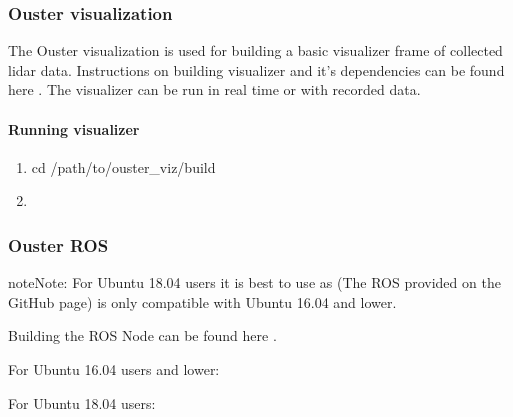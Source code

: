 \documentclass[letterpaper,10pt,english]{sphinxmanual}
\begin{document}
\subsubsection{Ouster visualization}
\label{\detokenize{Ouster lidar:ouster-visualization}}
The Ouster visualization is used for building a basic visualizer frame of collected lidar data. Instructions on building visualizer and it’s dependencies can be found here .
The visualizer can be run in real time or with recorded data.


\paragraph{Running visualizer}
\label{\detokenize{Ouster lidar:running-visualizer}}\begin{enumerate}
\def\theenumi{\arabic{enumi}}
\def\labelenumi{\theenumi .}
\makeatletter\def\p@enumii{\p@enumi \theenumi .}\makeatother
\item {} 
cd /path/to/ouster\_viz/build

\item {} 

\end{enumerate}


\subsubsection{Ouster ROS}
\label{\detokenize{Ouster lidar:ouster-ros}}
\begin{sphinxadmonition}{note}{Note:}
For Ubuntu 18.04 users it is best to use  as  (The ROS provided on the GitHub page) is only compatible with Ubuntu 16.04 and lower.
\end{sphinxadmonition}

Building the ROS Node can be found here .

For Ubuntu 16.04 users and lower: 

For Ubuntu 18.04 users: 
\end{document}
